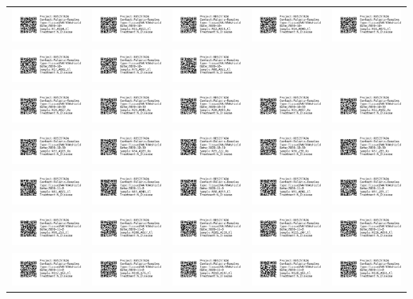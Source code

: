 \documentclass[10pt,notitlepage,letterpaper]{article}
\def\s{\phantom{xx}}
\def\w{1.27in}
\def\h{-0.030in}
\begin{document}
\pagestyle{empty}

\noindent 
\begin{tabular}[t]{ c @{\s} c @{\s} c @{\s} c @{\s} c }

\includegraphics[width=\w]{label_N7_A114_Cl} & \includegraphics[width=\w]{label_N11_A153_Cl} & \includegraphics[width=\w]{label_N13_A038_Cl} & \includegraphics[width=\w]{label_N14_A040_Cl} & \includegraphics[width=\w]{label_N16_A076_Cl} \\[\h]
\includegraphics[width=\w]{label_N17_A002_Cl} & \includegraphics[width=\w]{label_N79_A097_Cl} & \includegraphics[width=\w]{label_N80_A022_Cl} \\[\h] 

\includegraphics[width=\w]{label_N28_A027_Ra} & \includegraphics[width=\w]{label_N29_A041_Ra} & \includegraphics[width=\w]{label_N30_A089_Ra} & \includegraphics[width=\w]{label_N31_A097_Ra} & \includegraphics[width=\w]{label_N32_A102_Ra} \\[\h]
\includegraphics[width=\w]{label_N33_A163_Ra} & \includegraphics[width=\w]{label_N34_A183_Ra} & \includegraphics[width=\w]{label_N35_222_Ra} & \includegraphics[width=\w]{label_N36_238_Ra} & \includegraphics[width=\w]{label_N37_285_Ra} \\[\h]

\includegraphics[width=\w]{label_N81_A021_Cl} & \includegraphics[width=\w]{label_N83_A046_Cl} & \includegraphics[width=\w]{label_N90_A039_Cl} & \includegraphics[width=\w]{label_N91_A041_Cl} & \includegraphics[width=\w]{label_N97_205_Cl} \\[\h]
\includegraphics[width=\w]{label_N98_253_Cl} & \includegraphics[width=\w]{label_N100_A027_Cl} & \includegraphics[width=\w]{label_N101_A118_Cl} & \includegraphics[width=\w]{label_N115_247_Cl} & \includegraphics[width=\w]{label_N116_A058_Cl} \\[\h]
\includegraphics[width=\w]{label_N117_163_Cl} & \includegraphics[width=\w]{label_N118_176_Cl} & \includegraphics[width=\w]{label_N119_A107_Cl} & \includegraphics[width=\w]{label_N120_183_Cl} & \includegraphics[width=\w]{label_N136_A161_Cl}
\end{tabular}
\end{document}

